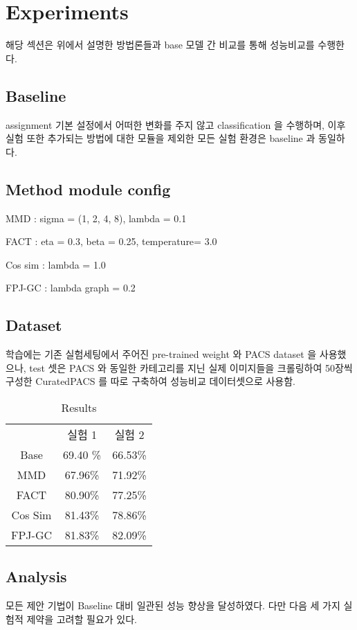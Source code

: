 \section{Experiments}
해당 섹션은 위에서 설명한 방법론들과 base 모델 간 비교를 통해 성능비교를 수행한다. 

\subsection{Baseline}
assignment 기본 설정에서 어떠한 변화를 주지 않고 classification 을 수행하며, 이후 실험 또한 추가되는 방법에 대한 모듈을 제외한 모든 실험 환경은 baseline 과 동일하다.

\subsection{Method module config}
MMD : sigma = (1, 2, 4, 8), lambda = 0.1

FACT : eta = 0.3, beta = 0.25, temperature= 3.0 

Cos sim : lambda = 1.0

FPJ-GC : lambda graph = 0.2

\subsection{Dataset}
학습에는 기존 실험세팅에서 주어진 pre-trained weight 와 PACS dataset 을 사용했으나, test 셋은 PACS 와 동일한 카테고리를 지닌 실제 이미지들을 크롤링하여 50장씩 구성한 CuratedPACS 를 따로 구축하여 성능비교 데이터셋으로 사용함. 

\begin{table}
    \centering
    \begin{tabular}{ccc}
             &  실험 1 & 실험 2 \\
        Base&  69.40 \%&66.53\% \\
         MMD&  67.96\%&71.92\% \\
         FACT&  80.90\%&77.25\% \\
         Cos Sim&  81.43\%&78.86\% \\
         FPJ-GC&  81.83\%&82.09\% \\
    \end{tabular}
    \caption{Results}
\end{table}

\subsection{Analysis}
모든 제안 기법이 Baseline 대비 일관된 성능 향상을 달성하였다. 다만 다음 세 가지 실험적 제약을 고려할 필요가 있다.

